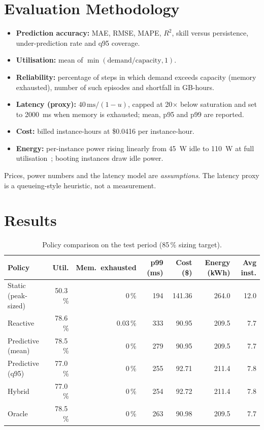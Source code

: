 \documentclass[11pt,a4paper]{article}
\begin{document}
\section{Evaluation Methodology}\label{sec:metrics}
\begin{itemize}
  \item \textbf{Prediction accuracy:} MAE, RMSE, MAPE, $R^2$, skill versus persistence, under-prediction rate and q95 coverage.
  \item \textbf{Utilisation:} mean of $\min(\text{demand}/\text{capacity},1)$.
  \item \textbf{Reliability:} percentage of steps in which demand exceeds capacity (memory exhausted), number of such episodes and shortfall in GB-hours.
  \item \textbf{Latency (proxy):} $40\,\text{ms}/(1-u)$, capped at 20$\times$ below saturation and set to 2000~ms when memory is exhausted; mean, p95 and p99 are reported.
  \item \textbf{Cost:} billed instance-hours at \$0.0416 per instance-hour.
  \item \textbf{Energy:} per-instance power rising linearly from 45~W idle to 110~W at full utilisation~\cite{barroso2007}; booting instances draw idle power.
\end{itemize}
Prices, power numbers and the latency model are \emph{assumptions}. The latency proxy is a queueing-style heuristic, not a measurement.

\section{Results}\label{sec:results}
\begin{table}[H]
\centering\caption{Policy comparison on the test period (85\,\% sizing target).}\label{tab:policies}
\small
\begin{tabular}{lrrrrrr}
\toprule
Policy & Util. & Mem.\ exhausted & p99 (ms) & Cost (\$) & Energy (kWh) & Avg inst.\\
\midrule
Static (peak-sized) & 50.3\,\% & 0\,\% & 194 & 141.36 & 264.0 & 12.0\\
Reactive & 78.6\,\% & 0.03\,\% & 333 & 90.95 & 209.5 & 7.7\\
Predictive (mean) & 78.5\,\% & 0\,\% & 279 & 90.95 & 209.5 & 7.7\\
Predictive (q95) & 77.0\,\% & 0\,\% & 255 & 92.71 & 211.4 & 7.8\\
Hybrid & 77.0\,\% & 0\,\% & 254 & 92.72 & 211.4 & 7.8\\
Oracle & 78.5\,\% & 0\,\% & 263 & 90.98 & 209.5 & 7.7\\
\bottomrule
\end{tabular}
\end{table}
\end{document}
